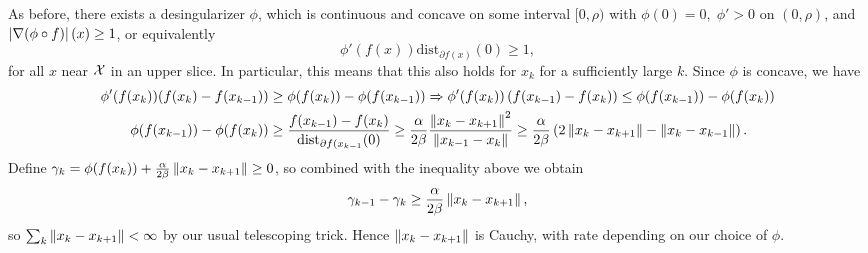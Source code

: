 As before, there exists a desingularizer $\phi$, which is continuous and
concave on some interval $[0, \rho)$ with $\phi(0) = 0, \; \phi' > 0$ on $(0,
\rho)$, and $\left| \nabla (\phi \circ f) \right|(x) \geq 1$, or equivalently
\[
    \phi'(f(x)) \mathrm{dist}_{\partial f(x)}(0) \geq 1,
\]
for all $x$ near $\mathcal{X}$ in an upper slice. In particular, this means that this
also holds for $x_k$ for a sufficiently large $k$. Since $\phi$ is concave, we
have
\begin{align*}
    \phi'(f(x_k)) (f(x_k) - f(x_{k-1})) &\geq \phi(f(x_k)) - \phi(f(x_{k-1}))
    \Rightarrow \phi'(f(x_k)) \left( f(x_{k-1}) - f(x_k) \right) \leq
    \phi(f(x_{k-1})) - \phi(f(x_k)) \\
    \phi(f(x_{k-1})) - \phi(f(x_k)) &\geq \frac{f(x_{k-1}) -
    f(x_k)}{\mathrm{dist}_{\partial f(x_{k-1}}(0)}
    \geq \frac{\alpha}{2 \beta} \frac{\left \| x_k - x_{k+1} \right \|^2}{\left \| x_{k-1} -
    x_k \right \|} \geq \frac{\alpha}{2 \beta} \left(2 \left \| x_k - x_{k+1} \right \| - \left \| x_k
    - x_{k-1} \right \| \right).
\end{align*}
Define $\gamma_k = \phi(f(x_k)) + \frac{\alpha}{2 \beta} \left \| x_k - x_{k+1} \right \|
    \geq 0$, so combined with the inequality above we obtain
\[
    \gamma_{k-1} - \gamma_k \geq \frac{\alpha}{2 \beta} \left \| x_k - x_{k+1} \right \|,
\]
so $\sum_{k} \left \| x_k - x_{k+1} \right \| < \infty$ by our usual telescoping trick.
Hence $\left \| x_k - x_{k+1} \right \|$ is Cauchy, with rate depending on our choice of
$\phi$.
